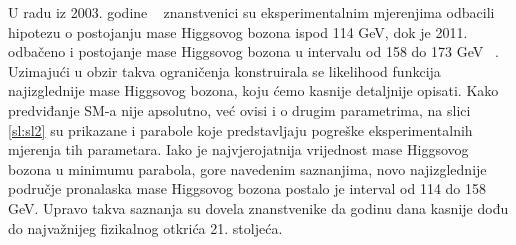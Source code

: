 \documentclass[12pt,a4paper,oneside]{article}
\begin{document}
\begin{linenumbers}
	
		U radu iz 2003. godine ~\cite{royal-sm8} znanstvenici su eksperimentalnim mjerenjima odbacili hipotezu o postojanju mase Higgsovog bozona ispod 114 GeV, dok je 2011. odbačeno i postojanje mase Higgsovog bozona u intervalu od 158 do 173 GeV ~\cite{royal-sm9}. Uzimajući u obzir takva ograničenja konstruirala se likelihood funkcija najizglednije mase Higgsovog bozona, koju ćemo kasnije detaljnije opisati.  Kako predviđanje SM-a nije apsolutno, već ovisi i o drugim parametrima, na slici \ref{sl:sl2} su prikazane i parabole koje predstavljaju pogreške eksperimentalnih mjerenja tih parametara. Iako je najvjerojatnija vrijednost mase Higgsovog bozona u minimumu parabola, gore navedenim saznanjima, novo najizglednije područje pronalaska mase Higgsovog bozona postalo je interval od 114 do 158 GeV. Upravo takva saznanja su dovela znanstvenike da godinu dana kasnije dođu do najvažnijeg fizikalnog otkrića 21. stoljeća.
		

\end{linenumbers}
\end{document}

